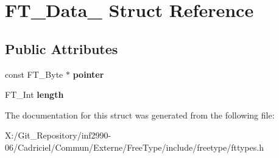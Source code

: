 \hypertarget{struct_f_t___data__}{\section{F\-T\-\_\-\-Data\-\_\- Struct Reference}
\label{struct_f_t___data__}
}
\subsection*{Public Attributes}
\begin{DoxyCompactItemize}
\item 
\hypertarget{struct_f_t___data___a4dea731b8a256b973757e1b8f612b050}{const F\-T\-\_\-\-Byte $\ast$ {\bfseries pointer}}\label{struct_f_t___data___a4dea731b8a256b973757e1b8f612b050}

\item 
\hypertarget{struct_f_t___data___af60c89dccd1852aceb0dc08675aca2fd}{F\-T\-\_\-\-Int {\bfseries length}}\label{struct_f_t___data___af60c89dccd1852aceb0dc08675aca2fd}

\end{DoxyCompactItemize}


The documentation for this struct was generated from the following file\-:\begin{DoxyCompactItemize}
\item 
X\-:/\-Git\-\_\-\-Repository/inf2990-\/06/\-Cadriciel/\-Commun/\-Externe/\-Free\-Type/include/freetype/fttypes.\-h\end{DoxyCompactItemize}
